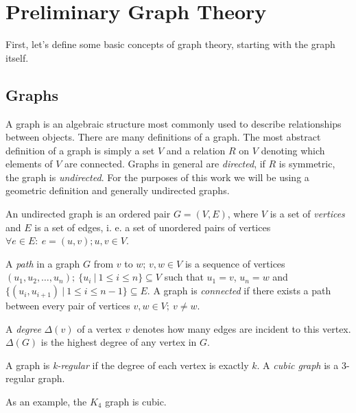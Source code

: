 \chapter{Preliminary Graph Theory}\label{ch:prelim}

First, let's define some basic concepts of graph theory, starting with the graph itself.

\section{Graphs}

A graph is an algebraic structure most commonly used to describe relationships between objects. There are many definitions of a graph. The most abstract definition of a graph is simply a set $V$ and a relation $R$ on $V$ denoting which elements of $V$ are connected. Graphs in general are \textit{directed}, if $R$ is symmetric, the graph is \textit{undirected}. For the purposes of this work we will be using a geometric definition and generally undirected graphs.

\begin{definition}
    An undirected graph is an ordered pair $G = (V, E)$, where $V$ is a set of \textit{vertices} and $E$ is a set of edges, i. e. a set of unordered pairs of vertices $\forall e \in E: ~ e = (u,v); u,v \in V$.
\end{definition}

\begin{definition}
    A \textit{path} in a graph $G$ from $v$ to $w$; $v,w \in V$ is a sequence of vertices $(u_1, u_2, \dots, u_n); ~ \{u_i ~|~ 1 \leq i \leq n\} \subseteq V$ such that $u_1 = v$, $u_n = w$ and $\{(u_i, u_{i+1}) ~|~ 1 \leq i \leq n-1\} \subseteq E$. A graph is \textit{connected} if there exists a path between every pair of vertices $v,w \in V; ~ v \neq w$.
\end{definition}

\begin{definition}
    A \textit{degree} $\Delta (v)$ of a vertex $v$ denotes how many edges are incident to this vertex. $\Delta(G)$ is the highest degree of any vertex in $G$.
\end{definition}

\begin{definition}
    A graph is \textit{k-regular} if the degree of each vertex is exactly $k$. A \textit{cubic graph} is a 3-regular graph.
\end{definition}

As an example, the $K_4$ graph is cubic.

